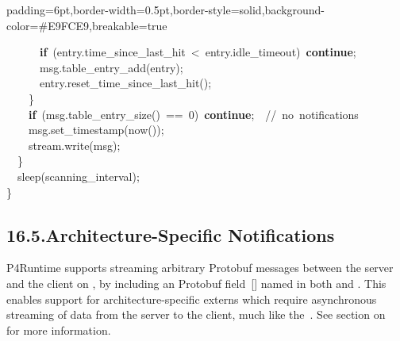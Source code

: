 \documentclass[11pt]{article}
\begin{document}
{\begin{mdbmargintb}{6pt}{6pt}
\begin{mdblock}{padding=6pt,border-width=0.5pt,border-style=solid,background-color=\#E9FCE9,breakable=true}
\begin{mdpre}
{{~~~~~~{\bfseries{if}}~(entry.time\_since\_last\_hit~\textless{}~entry.idle\_timeout)~{\bfseries{continue}};\\
~~~~~~msg.table\_entry\_add(entry);\\
~~~~~~entry.reset\_time\_since\_last\_hit();\\
~~~~\}\\
~~~~{\bfseries{if}}~(msg.table\_entry\_size()~==~{0})~{\bfseries{continue}};~~{//~no~notifications}\\
~~~~msg.set\_timestamp(now());\\
~~~~stream.write(msg);\\
~~\}\\
~~sleep(scanning\_interval);\\
\}}}%
\end{mdpre}%
\end{mdblock}%
\end{mdbmargintb}%

\subsection{16.5.\hspace*{0.5em}Architecture-Specific Notifications}\label{sec-architecture-specific-notifications}%

\noindent{}P4Runtime supports streaming arbitrary Protobuf messages between the server and
the client on , by including an  Protobuf field~[]
named  in both  and . This
enables support for architecture-specific externs which require asynchronous
streaming of data from the server to the client, much like the~. See section on~ for more information.%

}
\end{document}

